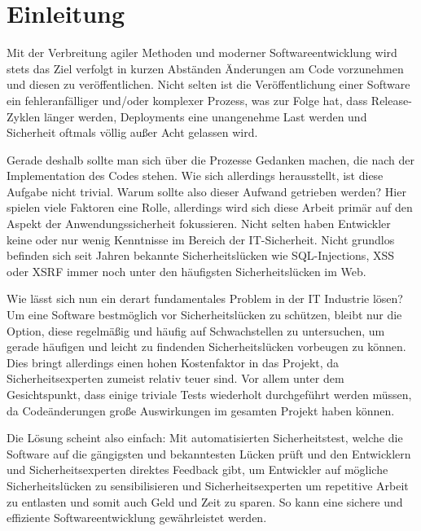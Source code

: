 
\section{Einleitung}\label{sec:introduction}
Mit der Verbreitung agiler Methoden und moderner Softwareentwicklung wird stets das Ziel verfolgt in kurzen Abständen Änderungen am Code vorzunehmen und diesen zu veröffentlichen.
Nicht selten ist die Veröffentlichung einer Software ein fehleranfälliger und/oder komplexer Prozess, was zur Folge hat, dass Release-Zyklen länger werden, Deployments eine unangenehme Last werden und Sicherheit oftmals völlig außer Acht gelassen wird.

Gerade deshalb sollte man sich über die Prozesse Gedanken machen, die nach der Implementation des Codes stehen.
Wie sich allerdings herausstellt, ist diese Aufgabe nicht trivial.
Warum sollte also dieser Aufwand getrieben werden?
Hier spielen viele Faktoren eine Rolle, allerdings wird sich diese Arbeit primär auf den Aspekt der Anwendungssicherheit fokussieren.
Nicht selten haben Entwickler keine oder nur wenig Kenntnisse im Bereich der IT-Sicherheit.
Nicht grundlos befinden sich seit Jahren bekannte Sicherheitslücken wie SQL-Injections, XSS oder XSRF immer noch unter den häufigsten Sicherheitslücken im Web.\cite{invictiInvictiAppSecIndicator2021}

Wie lässt sich nun ein derart fundamentales Problem in der IT Industrie lösen?
Um eine Software bestmöglich vor Sicherheitslücken zu schützen, bleibt nur die Option, diese regelmäßig und häufig auf Schwachstellen zu untersuchen, um gerade häufigen und leicht zu findenden Sicherheitslücken vorbeugen zu können.
Dies bringt allerdings einen hohen Kostenfaktor in das Projekt, da Sicherheitsexperten zumeist relativ teuer sind.
Vor allem unter dem Gesichtspunkt, dass einige triviale Tests wiederholt durchgeführt werden müssen, da Codeänderungen große Auswirkungen im gesamten Projekt haben können.

Die Lösung scheint also einfach: Mit automatisierten Sicherheitstest, welche die Software auf die gängigsten und bekanntesten Lücken prüft und den Entwicklern und Sicherheitsexperten direktes Feedback gibt, um Entwickler auf mögliche Sicherheitslücken zu sensibilisieren und Sicherheitsexperten um repetitive Arbeit zu entlasten und somit auch Geld und Zeit zu sparen.
So kann eine sichere und effiziente Softwareentwicklung gewährleistet werden.
